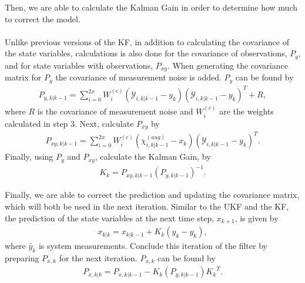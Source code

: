 \begin{enumerate}
              
       Then, we are able to calculate the Kalman Gain in order to determine how much to correct the model. \\ \\
       Unlike previous versions of the KF, in addition to calculating the covariance of the state variables, calculations is also done for the covariance of observations, $P_{y}$, and for state variables with observations, $P_{xy}$. When generating the covariance matrix for $P_{y}$ the covariance of measurement noise is added. $P_{y}$ can be found by
        \begin{align*}
       P_{y, k | k-1} = \sum^{2x}_{i = 0} W_i^{(c)} (\mathcal{Y}_{i, k | k - 1} -   y_{k} )(\mathcal{Y}_{i, k | k - 1} -  y_{k} )^T + R,
       \end{align*}
       where $R$ is the covariance of measurement noise and $W_i^{(c)} $ are the weights calculated in step 3. Next, calculate $P_{xy}$ by
        \begin{align*}
       P_{xy, k | k-1} = \sum^{2x}_{i = 0} W_i^{(c)} (\chi^{(aug)}_{i, k | k - 1} -   x_{k } )(\mathcal{Y}_{i, k | k - 1} -  y_{ k } )^T .
       \end{align*}
       Finally, using $P_{y}$ and $P_{xy}$, calculate the Kalman Gain, by
       \begin{align*}
       K_k = P_{xy, k | k-1} (P_{y, k | k-1}) ^{-1}.
       \end{align*}
        
        
        
      \noindent Finally, we are able to correct the prediction and updating the covariance matrix, which will both be used in the next iteration. Similar to the UKF and the KF, the prediction of the state variables at the next time step, $x_{k+1}$, is given by 
      \begin{align*}
        x_{k|k} = x_{k|k-1} + K_k(\hat y_k - y_{k}),
        \end{align*}
        where $\hat{y}_k$ is system measurements. Conclude this iteration of the filter by preparing $ P_{x, k} $ for the next iteration.  $P_{x, k} $ can be found by
       \begin{align*}
       P_{x, k|k} = P_{x, k|k-1} -K_k (P_{y, k | k-1} ) {K_k}^T.
       \end{align*}     
  
            
            
\newpage            
\centering


\end{enumerate}
